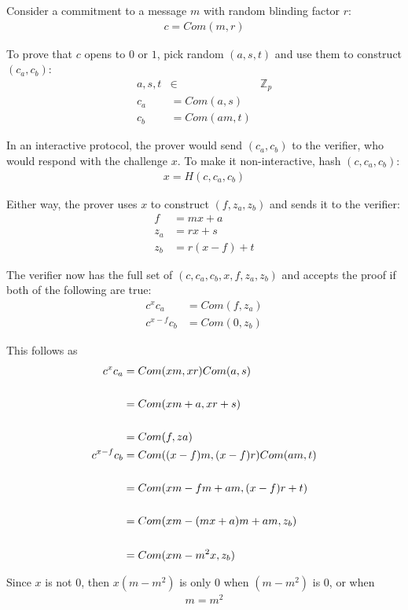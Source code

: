 \documentclass{article}
\begin{document}
Consider a commitment to a message $m$ with random blinding factor $r$:
\begin{align}
  c=Com(m, r)
\end{align}

To prove that $c$ opens to $0$ or $1$, pick random $(a,s,t)$ and use them to construct $(c_a, c_b)$:
\begin{align}
  a,s,t &\in& \mathbb{Z}_p\\
  c_a &= Com(a, s)\\
  c_b &= Com(am, t)
\end{align}

In an interactive protocol, the prover would send $(c_a,c_b)$ to the verifier, who would respond with the challenge $x$.  To make it non-interactive, hash $(c, c_a, c_b)$:
\begin{align}
  x = H(c, c_a, c_b)
\end{align}

Either way, the prover uses $x$ to construct $(f, z_a, z_b)$ and sends it to the verifier:
\begin{align}
  f &= mx + a\\
  z_a &= rx + s\\
  z_b &= r(x-f) + t
\end{align}

The verifier now has the full set of $(c, c_a, c_b, x, f, z_a, z_b)$ and accepts the proof if both of the following are true:
\begin{align}
  c^x c_a &= Com(f, z_a)\\
  c^{x-f} c_b &= Com(0, z_b)
\end{align}

This follows as 
\begin{align}
  c^x c_a &= Com(xm,xr) Com(a,s)\\
  \cr &= Com(xm+a, xr+s)\\
  \cr &= Com(f, za)\\
  c^{x-f} c_b &= Com((x-f)m, (x-f)r) Com(am, t)\\
  \cr &= Com(xm - fm + am, (x-f)r + t)\\
  \cr &= Com(xm - (mx + a)m + am, z_b)\\
  \cr &= Com(xm - m^2 x, z_b)
\end{align}

Since $x$ is not $0$, then $x (m-m^2)$ is only $0$ when $(m-m^2)$ is $0$, or when
\begin{align}
  m = m^2
\end{align}
\end{document}

